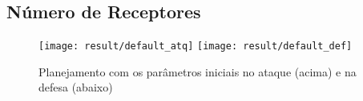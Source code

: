 \subsection{Número de Receptores}

\begin{figure}[H]
  \centering
  \texttt{[image: result/default\_atq]}
  \texttt{[image: result/default\_def]}
  \caption{Planejamento com os parâmetros iniciais no
           ataque (acima) e na defesa (abaixo)}\label{fig:default}
\end{figure}
